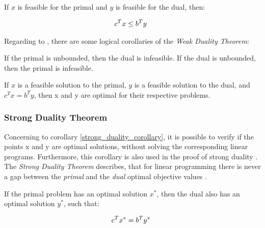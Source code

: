 \begin{theorem}
    If $x$ is feasible for the primal and 
    $y$ is feasible for the dual, then:

    \begin{equation*}
        \begin{array}{ll@{}ll}
            \displaystyle c^{T}x \leq b^{T}y&\\
        \end{array}
    \end{equation*}    

\end{theorem}

Regarding to , there are some logical corollaries 
of the \textit{Weak Duality Theorem}:

\begin{corollary}
    If the primal is unbounded, then the dual is infeasible. 
    If the dual is unbounded, then the primal is infeasible.
\end{corollary}

\begin{corollary}
\label{strong_duality_corollary}
    If $x$ is a feasible solution to the primal, 
    $y$ is a feasible solution to the dual,
    and $c^{T}x = b^{T}y$, then x and y are optimal for their respective problems.
\end{corollary}

\subsubsection{Strong Duality Theorem}
\label{sec:strong_duality_theorem}
Concerning to corollary \ref{strong_duality_corollary}, it is possible to verify if 
the points x and y are optimal solutions, without solving the corresponding linear programs. 
Furthermore, this corollary is also used in the proof of strong duality . 
The \textit{Strong Duality Theorem} describes, that for linear programming there 
is never a gap between the \textit{primal} and the \textit{dual} 
optimal objective values .

\begin{theorem}
    If  the primal problem has an optimal solution $x^{*}$,
    then the dual also has an optimal solution $y^{*}$,
    such that:

    \begin{equation*}
        \begin{array}{ll@{}ll}
            \displaystyle c^{T}x^{*} = b^{T}y^{*}&\\
        \end{array}
    \end{equation*}    

\end{theorem}

